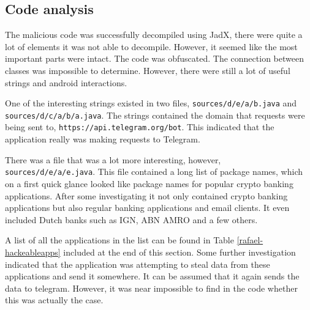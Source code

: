 \subsection{Code analysis}

The malicious code was successfully decompiled using JadX, there were quite a lot of elements it was not able to decompile.
However, it seemed like the most important parts were intact. 
The code was obfuscated. The connection between classes was impossible to determine.
However, there were still a lot of useful strings and android interactions.

One of the interesting strings existed in two files, \texttt{sources/d/e/a/b.java} and \texttt{sources/d/c/a/b/a.java}.
The strings contained the domain that requests were being sent to, \texttt{https://api.telegram.org/bot}.
This indicated that the application really was making requests to Telegram.

There was a file that was a lot more interesting, however, \texttt{sources/d/e/a/e.java}.
This file contained a long list of package names, which on a first quick glance looked like package names for popular crypto banking applications.
After some investigating it not only contained crypto banking applications but also regular banking applications and email clients.
It even included Dutch banks such as IGN, ABN AMRO and a few others. 

A list of all the applications in the list can be found in Table \ref{rafael-hackeableapps} included at the end of this section.
Some further investigation indicated that the application was attempting to steal data from these applications and send it somewhere.
It can be assumed that it again sends the data to telegram. However, it was near impossible to find in the code whether this was actually the case.

\newpage
